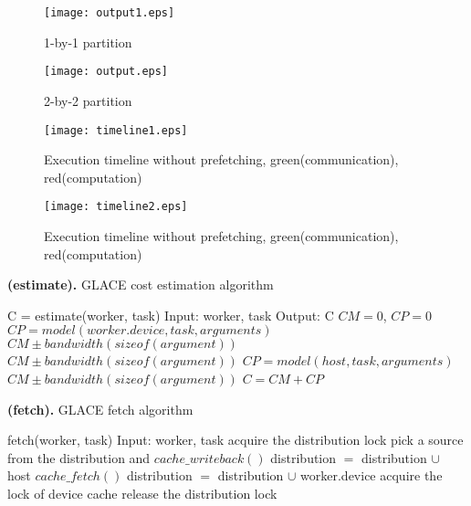 \documentclass[preprint,11pt]{elsarticle}
\begin{document}
\begin{figure}
  \centering
  \texttt{[image: output1.eps]} 
  \caption{1-by-1 partition}
  \label{fig:dep1}
\end{figure}
\begin{figure}
  \centering
  \texttt{[image: output.eps]} 
  \caption{2-by-2 partition}
  \label{fig:dep2}
\end{figure}

\begin{figure}
\begin{minipage} [t] {0.5\textwidth}
  \texttt{[image: timeline1.eps]} 
  \caption{Execution timeline without prefetching, green(communication), red(computation)}
  \label{fig:timeline1}
\end{minipage}
\begin{minipage} [t] {0.5\textwidth}
  \texttt{[image: timeline2.eps]} 
  \caption{Execution timeline without prefetching, green(communication), red(computation)}
  \label{fig:timeline2}
\end{minipage}
\end{figure}

\begin{algorithm}
\caption{{\bf (estimate).} GLACE cost estimation algorithm}
\label{alg:estimate}
{\footnotesize
\begin{algorithmic} [1]
\STATE C = estimate(worker, task)
\STATE Input: worker, task
\STATE Output: C
\STATE $CM = 0$, $CP = 0$
  \STATE $CP = model(worker.device, task, arguments)$
      \STATE $CM \pm bandwidth(sizeof(argument))$
        \STATE $CM \pm bandwidth(sizeof(argument))$
      \ENDIF
    \ENDIF
  \ENDFOR 
\ELSE
  \STATE $CP = model(host, task, arguments)$
      \STATE $CM \pm bandwidth(sizeof(argument))$
    \ENDIF
  \ENDFOR 
\ENDIF
\STATE $C = CM + CP$
\end{algorithmic}
}
\end{algorithm}

\begin{algorithm}
\caption{{\bf (fetch).} GLACE fetch algorithm}
\label{alg:fetch}
{\footnotesize
\begin{algorithmic} [1]
\STATE fetch(worker, task)
\STATE Input: worker, task
  \STATE acquire the distribution lock   
      \STATE pick a source from the distribution and $cache\_writeback()$
      \STATE distribution $=$ distribution $\cup$ host
    \ENDIF
      \STATE $cache\_fetch()$
      \STATE distribution $=$ distribution $\cup$ worker.device
    \ENDIF
  \ENDIF
  \STATE acquire the lock of device cache
  \STATE release the distribution lock
\ENDFOR
\end{algorithmic}
}
\end{algorithm}
\end{document}
